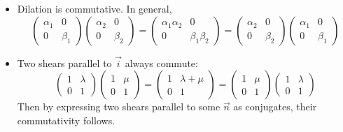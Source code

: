 \documentclass[fleqn,a4paper,11pt]{article}
\begin{document}
\begin{enumerate}[label=\textbf{\arabic*.}]
\begin{enumerate}[label=(\alph*)]
\begin{itemize}
\begin{itemize}
         \item
          Dilation is commutative. In general,
          \begin{equation*}
           \begin{pmatrix}
            \alpha_1 & 0 \\
            0 & \beta_1
           \end{pmatrix}
           \begin{pmatrix}
            \alpha_2 & 0 \\
            0 & \beta_2
           \end{pmatrix}
           =
           \begin{pmatrix}
            \alpha_1 \alpha_2 & 0 \\
            0 & \beta_1 \beta_2
           \end{pmatrix}
           =
           \begin{pmatrix}
            \alpha_2 & 0 \\
            0 & \beta_2
           \end{pmatrix}
           \begin{pmatrix}
            \alpha_1 & 0 \\
            0 & \beta_1
           \end{pmatrix}
          \end{equation*}
         \item
          Two shears parallel to \(\vec i\) always commute:
          \begin{equation*}
           \begin{pmatrix}
            1 & \lambda \\
            0 & 1
           \end{pmatrix}
           \begin{pmatrix}
            1 & \mu \\
            0 & 1
           \end{pmatrix}
           =
           \begin{pmatrix}
            1 & \lambda + \mu \\
            0 & 1
           \end{pmatrix}
           =
           \begin{pmatrix}
            1 & \mu \\
            0 & 1
           \end{pmatrix}
           \begin{pmatrix}
            1 & \lambda \\
            0 & 1
           \end{pmatrix}
          \end{equation*}
          Then by expressing two shears parallel to some \(\vec n\) as
          conjugates, their commutativity follows.


\end{itemize}
\end{itemize}
\end{enumerate}
\end{enumerate}
\end{document}
